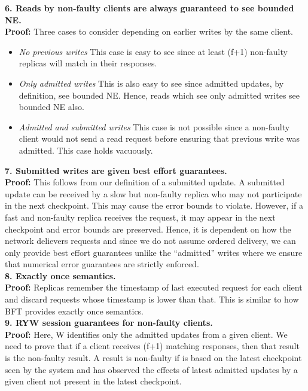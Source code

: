 \documentclass[twocolumn,10pt]{article}
\begin{document}
{\textbf{6. Reads by non-faulty clients are always guaranteed to see bounded NE.} \\
\textbf{Proof:} Three cases
to consider depending on earlier writes by the same client.
\begin{itemize}
\item{\textit{No previous writes}} This case is easy to see since at least (f+1) non-faulty replicas will
match in their responses.
\item{\textit{Only admitted writes}} This is also easy to see since admitted updates, by definition,
see bounded NE. Hence, reads which see only admitted writes see bounded NE also. 
\item{\textit{Admitted and submitted writes}} This case is not possible since a non-faulty client
would not send a read request before ensuring that previous write was admitted. This case
holds vacuously.
\end{itemize}

\textbf{7. Submitted writes are given best effort guarantees.} \\
\textbf{Proof:} This follows from our definition
of a submitted update. A submitted update can be received by a slow but 
non-faulty replica who may not participate in the next checkpoint. This may cause
the error bounds to violate. However, if a fast and non-faulty replica receives the
request, it may appear in the next checkpoint and error bounds are preserved. Hence,
it is dependent on how the network delievers requests and since we do not
assume ordered delivery, we can only provide
best effort guarantees unlike the ``admitted'' writes where we ensure that numerical
error guarantees are strictly enforced.\\

\textbf{8. Exactly once semantics.} \\
\textbf{Proof:} Replicas remember the timestamp of last 
executed request for each client and discard requests whose timestamp is lower than that.
This is similar to how BFT provides exactly once semantics.\\

\textbf{9. RYW session guarantees for non-faulty clients.} \\
\textbf{Proof:} Here, W identifies only the 
admitted updates from a given client. We need to prove that if a client
receives (f+1) matching responses, then that result is the non-faulty result. A 
result is non-faulty if is based on the latest checkpoint seen by the system
and has observed the effects of latest admitted updates by a given client not
present in the latest checkpoint.

}
\end{document}
